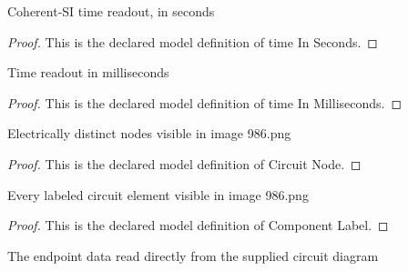 \begin{definition}
  \label{def:physics:phyx-mini-0986:phyxminiproblems-problemphyxmini0986-timeinseconds}
  Coherent-SI time readout, in seconds
\end{definition}
\begin{proof}
  This is the declared model definition of time In Seconds.
\end{proof}
\begin{definition}
  \label{def:physics:phyx-mini-0986:phyxminiproblems-problemphyxmini0986-timeinmilliseconds}
  Time readout in milliseconds
\end{definition}
\begin{proof}
  This is the declared model definition of time In Milliseconds.
\end{proof}
\begin{definition}
  \label{def:physics:phyx-mini-0986:phyxminiproblems-problemphyxmini0986-circuitnode}
  Electrically distinct nodes visible in image 986.png
\end{definition}
\begin{proof}
  This is the declared model definition of Circuit Node.
\end{proof}
\begin{definition}
  \label{def:physics:phyx-mini-0986:phyxminiproblems-problemphyxmini0986-componentlabel}
  Every labeled circuit element visible in image 986.png
\end{definition}
\begin{proof}
  This is the declared model definition of Component Label.
\end{proof}
\begin{definition}
  \label{def:physics:phyx-mini-0986:phyxminiproblems-problemphyxmini0986-circuitfigure}
  The endpoint data read directly from the supplied circuit diagram
\end{definition}
